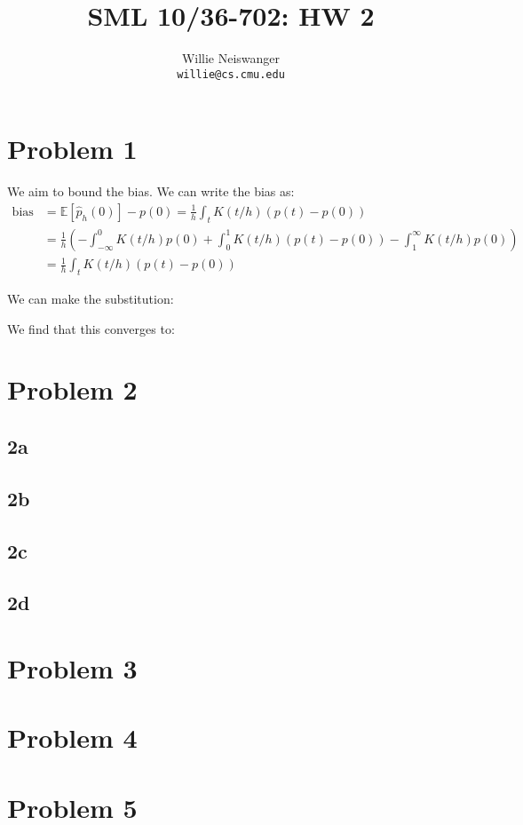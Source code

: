 \documentclass[12pt]{article}
\title{SML 10/36-702: HW 2}
\author{Willie Neiswanger\\
\texttt{willie@cs.cmu.edu}}
\begin{document}
\maketitle

\section*{Problem 1}
\label{sec:prob1}
We aim to bound the bias. We can write the bias as:
\begin{equation*}
    \begin{split}
        \text{bias} 
        &= \mathbb{E}\left[\hat{p}_h(0)\right] - p(0) = 
            \frac{1}{h} \int_t K(t/h)(p(t)-p(0)) \\
        &= \frac{1}{h} \left( -\int_{-\infty}^0 K(t/h)p(0) + \int_0^1 K(t/h)(p(t)-p(0)) - \int_1^{\infty}K(t/h)p(0) \right) \\
        &= \frac{1}{h} \int_t K(t/h)(p(t)-p(0))
    \end{split}
\end{equation*}

We can make the substitution:

We find that this converges to:

\section*{Problem 2}
\label{sec:prob2}

\subsection*{2a}

\subsection*{2b}

\subsection*{2c}

\subsection*{2d}


\section*{Problem 3}
\label{sec:prob3}


\section*{Problem 4}
\label{sec:prob4}


\section*{Problem 5}
\label{sec:prob5}
\end{document}
